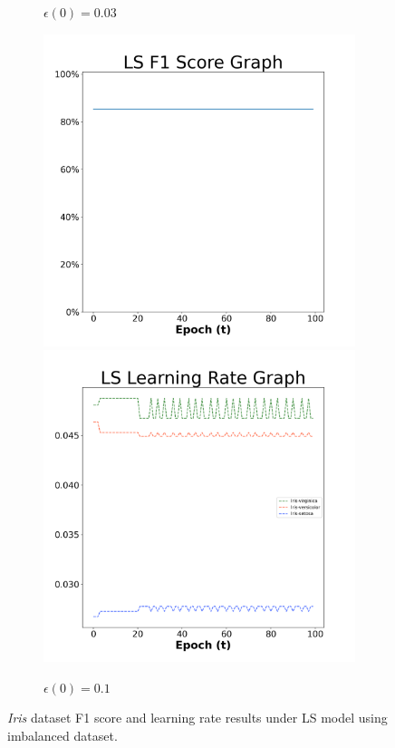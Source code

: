 \begin{figure}[H]
\begin{subfigure}{0.3\textwidth}
  \caption{$\epsilon(0)=0.03$}
\end{subfigure}\hfil %
\begin{subfigure}{0.3\textwidth}
  \includegraphics[width=\linewidth]{images/exper2/iris/LS_0.1_f1.png}
  \includegraphics[width=\linewidth]{images/exper2/iris/LS_0.1_lr.png}
  \caption{$\epsilon(0)=0.1$}
\end{subfigure}

\caption{\textit{Iris} dataset F1 score and learning rate results under LS model using imbalanced dataset.}
\end{figure}


